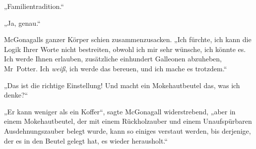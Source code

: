 „Familientradition.“

„Ja, genau.“

McGonagalls ganzer Körper schien zusammenzusacken. „Ich fürchte, ich kann die Logik Ihrer Worte nicht bestreiten, obwohl ich mir sehr wünsche, ich könnte es. Ich werde Ihnen erlauben, zusätzliche einhundert Galleonen abzuheben, Mr~Potter. Ich \emph{weiß}, ich werde das bereuen, und ich mache es trotzdem.“

„Das ist die richtige Einstellung! Und macht ein Mokehautbeutel das, was ich denke?“%

„Er kann weniger als ein Koffer“, sagte McGonagall widerstrebend, „aber in einem Mokehautbeutel, der mit einem Rückholzauber und einem Unaufspürbaren Ausdehnungszauber belegt wurde, kann so einiges verstaut werden, bis derjenige, der es in den Beutel gelegt hat, es wieder herausholt.“

